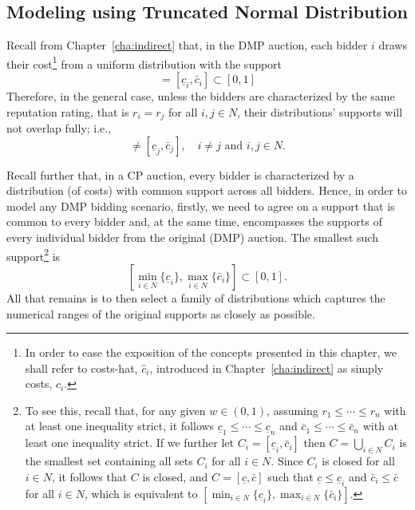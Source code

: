 \subsection{Modeling using Truncated Normal Distribution} %
\label{sub:modeling_using_truncated_normal_distribution_approximation}
Recall from Chapter~\ref{cha:indirect} that, in the DMP auction, each bidder $i$ draws their cost\footnote{In order to ease the exposition of the concepts presented in this chapter, we shall refer to costs-hat, $\hat{c}_i$, introduced in Chapter~\ref{cha:indirect} as simply costs, $c_i$.} from a uniform distribution with the support
\begin{equation*}
  [(1-w)r_i, (1-w)r_i + w] = [\underline{c}_i, \bar{c}_i] \subset [0,1]
\end{equation*}
Therefore, in the general case, unless the bidders are characterized by the same reputation rating, that is $r_i=r_j$ for all $i,j\in N$, their distributions' supports will not overlap fully; i.e.,
\begin{equation*}
  [\underline{c}_i,\bar{c}_i] \neq [\underline{c}_j,\bar{c}_j], \quad i\neq j \text{ and } i,j\in N.
\end{equation*}

Recall further that, in a CP auction, every bidder is characterized by a distribution (of costs) with common support across all bidders. Hence, in order to model any DMP bidding scenario, firstly, we need to agree on a support that is common to every bidder and, at the same time, encompasses the supports of every individual bidder from the original (DMP) auction. The smallest such support\footnote{To see this, recall that, for any given $w\in (0,1)$, assuming $r_1\leq\cdots\leq r_n$ with at least one inequality strict, it follows $\underline{c}_1\leq\cdots\leq\underline{c}_n$ and $\bar{c}_1\leq\cdots\leq\bar{c}_n$ with at least one inequality strict. If we further let $C_i = [\underline{c}_i, \bar{c}_i]$ then $C = \bigcup_{i\in N} C_i$ is the smallest set containing all sets $C_i$ for all $i\in N$. Since $C_i$ is closed for all $i\in N$, it follows that $C$ is closed, and $C = [\underline{c}, \bar{c}]$ such that $\underline{c} \leq \underline{c}_i$ and $\bar{c}_i\leq \bar{c}$ for all $i\in N$, which is equivalent to $[\min_{i\in N}\{\underline{c}_i\}, \max_{i\in N}\{\bar{c}_i\}]$.} is
\begin{equation}
  \label{eq:domain_common_priors_approximation}
  \displaystyle\left[\min_{i\in N}\{\underline{c}_i\}, \max_{i\in N}\{\bar{c}_i\}\right] \subset [0,1].
\end{equation}
All that remains is to then select a family of distributions which captures the numerical ranges of the original supports as closely as possible.

